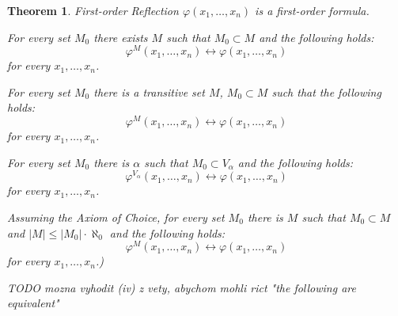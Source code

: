 \documentclass[12pt,a4paper]{article}
\newtheorem{theorem}{Theorem}[section]
\renewcommand{\iff}{\leftrightarrow}
\newcommand{\bce}{\begin{compactenum}}
\newcommand{\ece}{\end{compactenum}}
\begin{document}
\begin{theorem}{First-order Reflection}
$\varphi(x_1, \ldots, x_n)$ is a first-order formula.
\bce[(i)]
\item For every set $M_0$ there exists $M$ such that $M_0 \subset M$ and the following holds:
\begin{equation}
\varphi^M(x_1, \ldots, x_n) \iff \varphi(x_1, \ldots, x_n)
\end{equation}
for every $x_1, \ldots, x_n$.

\item For every set $M_0$  there is a transitive set $M$, $M_0 \subset M$ such that the following holds:
\begin{equation}
\varphi^M(x_1, \ldots, x_n) \iff \varphi(x_1, \ldots, x_n)
\end{equation}
for every $x_1, \ldots, x_n$.

\item For every set $M_0$ there is $\alpha$ such that $M_0 \subset V_{\alpha}$ and the following holds:
\begin{equation}
\varphi^{V_{\alpha}}(x_1, \ldots, x_n) \iff \varphi(x_1, \ldots, x_n)
\end{equation}
for every $x_1, \ldots, x_n$.

\item Assuming the Axiom of Choice, for every set $M_0$ there is $M$ such that $M_0 \subset M$ and $|M| \leq |M_0| \cdot \aleph_0$ and the following holds:
\begin{equation}
\varphi^M(x_1, \ldots, x_n) \iff \varphi(x_1, \ldots, x_n)
\end{equation}
for every $x_1, \ldots, x_n$.)

TODO mozna vyhodit (iv) z vety, abychom mohli rict "the following are equivalent"
\ece
\end{theorem}
\end{document}

